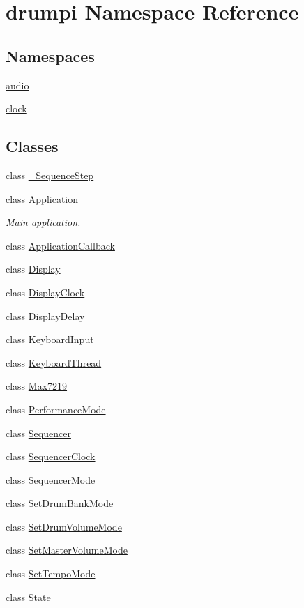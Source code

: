 \hypertarget{namespacedrumpi}{}\section{drumpi Namespace Reference}
\label{namespacedrumpi}
\subsection*{Namespaces}
\begin{DoxyCompactItemize}
\item 
 \hyperlink{namespacedrumpi_1_1audio}{audio}
\item 
 \hyperlink{namespacedrumpi_1_1clock}{clock}
\end{DoxyCompactItemize}
\subsection*{Classes}
\begin{DoxyCompactItemize}
\item 
class \hyperlink{classdrumpi_1_1__SequenceStep}{\+\_\+\+Sequence\+Step}
\item 
class \hyperlink{classdrumpi_1_1Application}{Application}
\begin{DoxyCompactList}\small\item\em Main application. \end{DoxyCompactList}\item 
class \hyperlink{classdrumpi_1_1ApplicationCallback}{Application\+Callback}
\item 
class \hyperlink{classdrumpi_1_1Display}{Display}
\item 
class \hyperlink{classdrumpi_1_1DisplayClock}{Display\+Clock}
\item 
class \hyperlink{classdrumpi_1_1DisplayDelay}{Display\+Delay}
\item 
class \hyperlink{classdrumpi_1_1KeyboardInput}{Keyboard\+Input}
\item 
class \hyperlink{classdrumpi_1_1KeyboardThread}{Keyboard\+Thread}
\item 
class \hyperlink{classdrumpi_1_1Max7219}{Max7219}
\item 
class \hyperlink{classdrumpi_1_1PerformanceMode}{Performance\+Mode}
\item 
class \hyperlink{classdrumpi_1_1Sequencer}{Sequencer}
\item 
class \hyperlink{classdrumpi_1_1SequencerClock}{Sequencer\+Clock}
\item 
class \hyperlink{classdrumpi_1_1SequencerMode}{Sequencer\+Mode}
\item 
class \hyperlink{classdrumpi_1_1SetDrumBankMode}{Set\+Drum\+Bank\+Mode}
\item 
class \hyperlink{classdrumpi_1_1SetDrumVolumeMode}{Set\+Drum\+Volume\+Mode}
\item 
class \hyperlink{classdrumpi_1_1SetMasterVolumeMode}{Set\+Master\+Volume\+Mode}
\item 
class \hyperlink{classdrumpi_1_1SetTempoMode}{Set\+Tempo\+Mode}
\item 
class \hyperlink{classdrumpi_1_1State}{State}
\end{DoxyCompactItemize}
